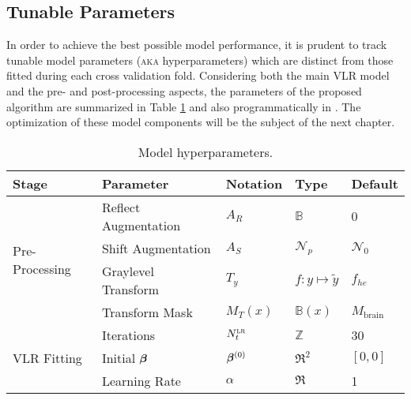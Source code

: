 \subsection{Tunable Parameters}
In order to achieve the best possible model performance, it is prudent to track tunable model parameters (\textsc{aka} hyperparameters) which are distinct from those fitted during each cross validation fold. Considering both the main VLR model and the pre- and post-processing aspects, the parameters of the proposed algorithm are summarized in Table \ref{tab:hyperparams} and also programmatically in . The optimization of these model components will be the subject of the next chapter. 
\begin{table}
  \centering
  \caption{Model hyperparameters.}
  \label{tab:hyperparams}
  \begin{tabular}{lllll}
    \hline
    Stage                            & Parameter            & Notation                    & Type                                          & Default                   \\ \hline
    \multirow{4}{*}{Pre-Processing}  & Reflect Augmentation & $A_R$                       & $\mathbb{B}$                                  & 0                         \\
                                     & Shift Augmentation   & $A_S$                       & $\mathcal{N}_p$                                        & $\mathcal{N}_0$                    \\
                                     & Graylevel Transform  & $T_y$                       & $f: y\mapsto \tilde{y}$                       & $f_{he}$                  \\
                                     & Transform Mask       & $M_{T}(x)$                  & $\mathbb{B}(x)$                               & $M_{\text{brain}}$        \\ \hline
    \multirow{6}{*}{VLR Fitting}     & Iterations           & $N_{t}^{\textsc{lr}}$               & $\mathbb{Z}$                                  & 30                        \\
                                     & Initial $\bm{\beta}$        & $\bm{\beta}^{(0)}$                 & $\Re^2$                                       & $[0,0]$                   \\
                                     & Learning Rate        & $\alpha$                    & $\Re$                                         & 1                         \\

\end{tabular}
\end{table}
